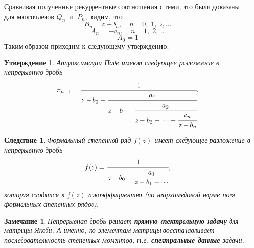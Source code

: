 \documentclass[12pt,a4paper]{article}
\theoremstyle{plain}   \newtheorem{Pro}{Задача}
\newtheorem{Sta}{Утверждение}
\newtheorem{Rem}{Замечание}
\newtheorem{Cor}{Следствие}
\begin{document}
Сравнивая полученные рекуррентные соотношения с теми,
что были доказаны для многочленов
$ Q_n \; $
и
$ \; P_n ,$
видим, что
$$
  B_n =z-b_n , \quad n=0, \; 1, \; 2,...
$$
$$
  A_n =-a_n , \quad n=1, \; 2, ...
$$
$$
  A_0 =1
$$
Таким образом приходим к следующему утверждению.
\begin{Sta}
Аппроксимации Паде имеют следующее разложение в непрерывную дробь
\begin{equation*}
  \pi _{n+1} =
   \cfrac{1}{z-b_0 -
    \cfrac{a_1 }{z-b_1 -
	 \cfrac{a_2}{z-b_2 - \dotsb -
	  \cfrac{a_n}{z-b_n }}}}.
\end{equation*}
\end{Sta}
\begin{Cor}
Формальный степенной ряд
$ f(z) $
имеет следующее разложение в непрерывную дробь
\begin{equation*}
  f(z)=
    \cfrac{1}{z-b_0 -
	 \cfrac{a_1 }{z-b_1 - \dotsb }},
\end{equation*}
которая сходится к
$ f(z) $
покоэффициентно (по неархимедовой норме поля формальных
степенных рядов).
\end{Cor}
\begin{Rem}
Непрерывная дробь решает
{\bfseries прямую спектральную задачу}
для матрицы Якоби. А именно, по элементам матрицы
восстанавливает последовательность степенных моментов, т.е.
{\bfseries спектральные данные}
задачи.
\end{Rem}
$ \; $
\\
\end{document}
